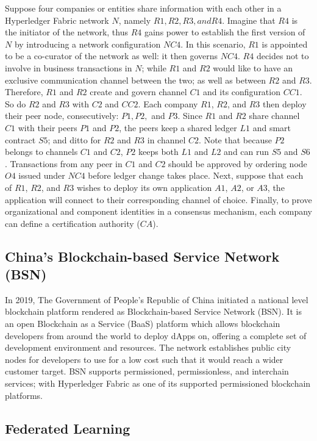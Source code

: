 \documentclass[a4paper,12pt,oneside, utf8x]{report}
\begin{document}
Suppose four companies or entities share information with each other in a Hyperledger Fabric network $N$, namely $R1, R2, R3, and R4$. Imagine that $R4$ is the initiator of the network, thus $R4$ gains power to establish the first version of $N$ by introducing a network configuration $NC4$. In this scenario, $R1$ is appointed to be a co-curator of the network as well: it then governs $NC4$. $R4$ decides not to involve in business transactions in $N$; while $R1$ and $R2$ would like to have an exclusive communication channel between the two; as well as between $R2$ and $R3$. Therefore, $R1$ and $R2$ create and govern channel $C1$ and its configuration $CC1$. So do $R2$ and $R3$ with $C2$ and $CC2$. Each company $R1$, $R2$, and $R3$ then deploy their peer node, consecutively: $P1, P2,$ and $P3$. Since $R1$ and $R2$ share channel $C1$ with their peers $P1$ and $P2$, the peers keep a shared ledger $L1$ and smart contract $S5$; and ditto for $R2$ and $R3$ in channel $C2$. Note that because $P2$ belongs to channels $C1$ and $C2$, $P2$ keeps both $L1$ and $L2$ and can run $S5$ and $S6$. Transactions from any peer in $C1$ and $C2$ should be approved by ordering node $O4$ issued under $NC4$ before ledger change takes place. Next, suppose that each of $R1$, $R2$, and $R3$ wishes to deploy its own application $A1$, $A2$, or $A3$, the application will connect to their corresponding channel of choice. Finally, to prove organizational and component identities in a consensus mechanism, each company can define a certification authority ($CA$).

\subsection{China’s Blockchain-based Service Network (BSN) \cite{y8,y27}}
In 2019, The Government of People’s Republic of China initiated a national level blockchain platform rendered as Blockchain-based Service Network (BSN). It is an open Blockchain as a Service (BaaS) platform which allows blockchain developers from around the world to deploy dApps on, offering a complete set of development environment and resources. The network establishes public city nodes for developers to use for a low cost such that it would reach a wider customer target. BSN supports permissioned, permissionless, and interchain services; with Hyperledger Fabric as one of its supported permissioned blockchain platforms.

\subsection{Federated Learning}
\end{document}
